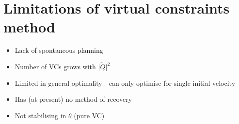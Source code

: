 \section{Limitations of virtual constraints method}
\begin{itemize}
	\item Lack of spontaneous planning
	\item Number of VCs grows with $\lvert\tilde{Q}\rvert^2$
	\item Limited in general optimality - can only optimise for single initial velocity
	\item Has (at present) no method of recovery
	\item Not stabilising in $\theta$ (pure VC)
\end{itemize}